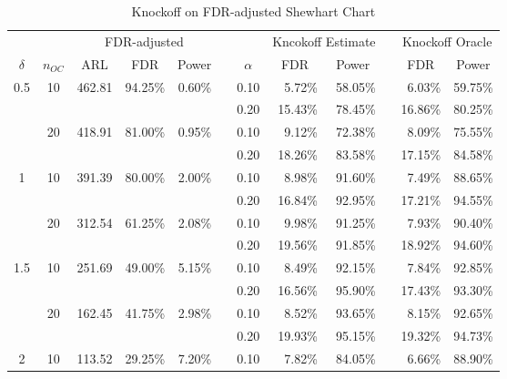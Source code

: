 \documentclass[]{interact}
\theoremstyle{plain}%
\theoremstyle{definition}
\theoremstyle{remark}
\begin{document}
\begin{table}[htbp]
  \centering
  \caption{Knockoff on FDR-adjusted Shewhart Chart}
    \begin{tabular}{ccrrrrrrrrrr}
\toprule     &   & \multicolumn{3}{c}{FDR-adjusted } &   &   & \multicolumn{2}{c}{Kncokoff Estimate} &   & \multicolumn{2}{c}{Knockoff Oracle} \\
\cmidrule{3-5}\cmidrule{7-9}\cmidrule{11-12}    \multicolumn{1}{c}{$\delta$} & \multicolumn{1}{c}{$n_{OC}$} & \multicolumn{1}{c}{ARL} & \multicolumn{1}{c}{FDR} & \multicolumn{1}{c}{Power} &   & \multicolumn{1}{c}{$\alpha$} & \multicolumn{1}{c}{FDR} & \multicolumn{1}{c}{Power} &   & \multicolumn{1}{c}{FDR} & \multicolumn{1}{c}{Power} \\
    \midrule
    0.5 & 10 &         462.81  & 94.25\% & 0.60\% &   &             0.10  & 5.72\% & 58.05\% &   & 6.03\% & 59.75\% \\
      &   &   &   &   &   &             0.20  & 15.43\% & 78.45\% &   & 16.86\% & 80.25\% \\
      & 20 &         418.91  & 81.00\% & 0.95\% &   &             0.10  & 9.12\% & 72.38\% &   & 8.09\% & 75.55\% \\
      &   &   &   &   &   &             0.20  & 18.26\% & 83.58\% &   & 17.15\% & 84.58\% \\
    1 & 10 &         391.39  & 80.00\% & 2.00\% &   &             0.10  & 8.98\% & 91.60\% &   & 7.49\% & 88.65\% \\
      &   &   &   &   &   &             0.20  & 16.84\% & 92.95\% &   & 17.21\% & 94.55\% \\
      & 20 &         312.54  & 61.25\% & 2.08\% &   &             0.10  & 9.98\% & 91.25\% &   & 7.93\% & 90.40\% \\
      &   &   &   &   &   &             0.20  & 19.56\% & 91.85\% &   & 18.92\% & 94.60\% \\
    1.5 & 10 &         251.69  & 49.00\% & 5.15\% &   &             0.10  & 8.49\% & 92.15\% &   & 7.84\% & 92.85\% \\
      &   &   &   &   &   &             0.20  & 16.56\% & 95.90\% &   & 17.43\% & 93.30\% \\
      & 20 &         162.45  & 41.75\% & 2.98\% &   &             0.10  & 8.52\% & 93.65\% &   & 8.15\% & 92.65\% \\
      &   &   &   &   &   &             0.20  & 19.93\% & 95.15\% &   & 19.32\% & 94.73\% \\
    2 & 10 &         113.52  & 29.25\% & 7.20\% &   &             0.10  & 7.82\% & 84.05\% &   & 6.66\% & 88.90\% \\

\end{tabular}
\end{table}
\end{document}
